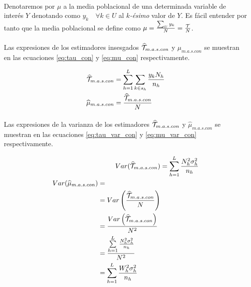 \documentclass{article}
\begin{document}
    \paragraph{}
    Denotaremos por $\mu$ a la media poblacional de una determinada variable de interés $Y$ denotando como $y_k \quad \forall k \in U$ al \emph{$k$-ésimo} valor de $Y$. Es fácil entender por tanto que la media poblacional se define como $\mu = \frac{\sum_U y_k}{N} = \frac{\mathcal{T}}{N}$.


    \paragraph{}
    Las expresiones de los estimadores insesgados $\widehat{\mathcal{T}}_{m.a.s.con}$ y $\widehat{\mu}_{m.a.s.con}$ se muestran en las ecuaciones \eqref{eq:tau_con} y \eqref{eq:mu_con} respectivamente.

    \begin{align}
    \label{eq:tau_con}
      \widehat{\mathcal{T}}_{m.a.s.con} &= \sum\limits_{h=1}^L\sum\limits_{k \in s_h}\frac{y_kN_h}{n_h} \\
    \label{eq:mu_con}
      \widehat{\mu}_{m.a.s.con} &= \frac{\widehat{\mathcal{T}}_{m.a.s.con}}{N}\\
    \end{align}


    \paragraph{}
    Las expresiones de la varianza de los estimadores $\widehat{\mathcal{T}}_{m.a.s.con}$ y $\widehat{\mu}_{m.a.s.con}$ se muestran en las ecuaciones \eqref{eq:tau_var_con} y \eqref{eq:mu_var_con} respectivamente.

    \begin{align}
    \label{eq:tau_var_con}
      Var(\widehat{\mathcal{T}}_{m.a.s.con}) &= \sum\limits_{h=1}^L\frac{N_h^2\sigma_h^{2}}{n_h} \\
    \label{eq:mu_var_con}
      \begin{split}
        Var(\widehat{\mu}_{m.a.s.con}) &=\\
        &= Var\left(\frac{\widehat{\mathcal{T}}_{m.a.s.con}}{N}\right) \\
        &= \frac{Var\left(\widehat{\mathcal{T}}_{m.a.s.con}\right)}{N^2} \\
        &= \frac{\sum\limits_{h=1}^L\frac{N_h^2\sigma_h^{2}}{n_h}}{N^2} \\
        &= \sum\limits_{h=1}^L\frac{W_h^2\sigma_h^{2}}{n_h}
      \end{split}
    \end{align}
\end{document}
